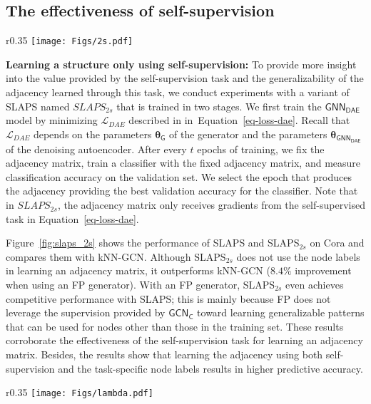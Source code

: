 \documentclass{article}
\def\Eqref#1{Equation~\ref{#1}}
\newcommand{\loss}[1]{\ensuremath{\mathcal{#1}}}
\newcommand{\func}[1]{\ensuremath{\mathsf{#1}}}
\begin{document}
\subsection{The effectiveness of self-supervision}

\begin{wrapfigure}{r}{0.35\columnwidth}
    \centering
    \texttt{[image: Figs/2s.pdf]}
    \caption{SLAPS vs SLAPS$_{2s}$ on Cora with different generators.}
    \label{fig:slaps_2s}
\end{wrapfigure}

\textbf{Learning a structure only using self-supervision:}
To provide more insight into the value provided by the self-supervision task and the generalizability of the adjacency learned through this task, we conduct experiments with a variant of SLAPS named $SLAPS_{2s}$ that is trained in two stages. We first train the \func{GNN_{DAE}} model by minimizing $\loss{L}_{DAE}$ described in in~\Eqref{eq-loss-dae}. Recall that $\loss{L}_{DAE}$ depends on the parameters $\bm{\theta}_\func{G}$ of the generator and the parameters $\bm{\theta}_{\func{GNN_{DAE}}}$ of the denoising autoencoder. After every $t$ epochs of training, we fix the adjacency matrix, train a classifier with the fixed adjacency matrix, and measure classification accuracy on the validation set. We select the epoch that produces the adjacency providing the best validation accuracy for the classifier. Note that in $SLAPS_{2s}$, the adjacency matrix only receives gradients from the self-supervised task in \Eqref{eq-loss-dae}.

Figure~\ref{fig:slaps_2s} shows the performance of SLAPS and SLAPS$_{2s}$ on Cora and compares them with kNN-GCN. Although SLAPS$_{2s}$ does not use the node labels in learning an adjacency matrix, it outperforms kNN-GCN ($8.4\%$ improvement when using an FP generator). With an FP generator, SLAPS$_{2s}$ even achieves competitive performance with SLAPS; this is mainly because FP does not leverage the supervision provided by $\func{GCN_C}$ toward learning generalizable patterns that can be used for nodes other than those in the training set. These results corroborate the effectiveness of the self-supervision task for learning an adjacency matrix. Besides, the results show that learning the adjacency using both self-supervision and the task-specific node labels results in higher predictive accuracy.

\begin{wrapfigure}{r}{0.35\columnwidth}
    \centering
    \texttt{[image: Figs/lambda.pdf]}
    \caption{The performance of SLAPS with MLP graph generator as a function of $\lambda$.}
    \label{fig:lambda}
\end{wrapfigure}
\end{document}
